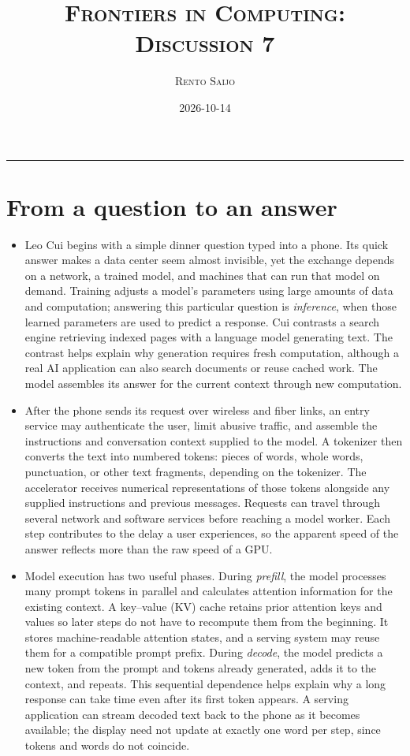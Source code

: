 \documentclass[10pt]{article}
\title{\Large\textsc{Frontiers in Computing: Discussion 7}}
\author{\large\textsc{Rento Saijo}}
\date{2026-10-14}
\begin{document}
\maketitle
\thispagestyle{fancy}
\vspace{-1em}\rule{\linewidth}{0.6pt}\vspace{0.5em}

\section*{From a question to an answer}

\begin{itemize}[leftmargin=1.25em, itemsep=0.3em, parsep=0pt, topsep=0pt]
    \item Leo Cui begins with a simple dinner question typed into a phone. Its quick answer makes a data center seem almost invisible, yet the exchange depends on a network, a trained model, and machines that can run that model on demand. Training adjusts a model's parameters using large amounts of data and computation; answering this particular question is \textit{inference}, when those learned parameters are used to predict a response. Cui contrasts a search engine retrieving indexed pages with a language model generating text. The contrast helps explain why generation requires fresh computation, although a real AI application can also search documents or reuse cached work. The model assembles its answer for the current context through new computation.

    \item After the phone sends its request over wireless and fiber links, an entry service may authenticate the user, limit abusive traffic, and assemble the instructions and conversation context supplied to the model. A tokenizer then converts the text into numbered tokens: pieces of words, whole words, punctuation, or other text fragments, depending on the tokenizer. The accelerator receives numerical representations of those tokens alongside any supplied instructions and previous messages. Requests can travel through several network and software services before reaching a model worker. Each step contributes to the delay a user experiences, so the apparent speed of the answer reflects more than the raw speed of a GPU.

    \item Model execution has two useful phases. During \textit{prefill}, the model processes many prompt tokens in parallel and calculates attention information for the existing context. A key--value (KV) cache retains prior attention keys and values so later steps do not have to recompute them from the beginning. It stores machine-readable attention states, and a serving system may reuse them for a compatible prompt prefix. During \textit{decode}, the model predicts a new token from the prompt and tokens already generated, adds it to the context, and repeats. This sequential dependence helps explain why a long response can take time even after its first token appears. A serving application can stream decoded text back to the phone as it becomes available; the display need not update at exactly one word per step, since tokens and words do not coincide.


\end{itemize}
\end{document}
